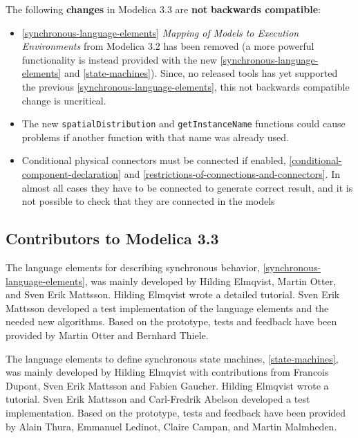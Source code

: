 The following \textbf{changes} in Modelica 3.3 are \textbf{not}
\textbf{backwards compatible}:

\begin{itemize}
\item
  \autoref{synchronous-language-elements} \emph{Mapping of Models to Execution Environments} from
  Modelica 3.2 has been removed (a more powerful functionality is
  instead provided with the new \autoref{synchronous-language-elements} and \autoref{state-machines}). Since, no
  released tools has yet supported the previous \autoref{synchronous-language-elements}, this not
  backwards compatible change is uncritical.
\item
  The new \lstinline!spatialDistribution! and \lstinline!getInstanceName! functions could cause
  problems if another function with that name was already used.
\end{itemize}

\begin{itemize}
\item
  Conditional physical connectors must be connected if enabled,
  \autoref{conditional-component-declaration}
  and \autoref{restrictions-of-connections-and-connectors}. In almost all cases they have to be connected
  to generate correct result, and it is not possible to check that they
  are connected in the models
\end{itemize}

\subsection{Contributors to Modelica 3.3}

The language elements for describing synchronous behavior, \autoref{synchronous-language-elements},
was mainly developed by Hilding Elmqvist, Martin Otter, and Sven Erik
Mattsson. Hilding Elmqvist wrote a detailed tutorial. Sven Erik Mattsson
developed a test implementation of the language elements and the needed
new algorithms. Based on the prototype, tests and feedback have been
provided by Martin Otter and Bernhard Thiele.

The language elements to define synchronous state machines, \autoref{state-machines},
was mainly developed by Hilding Elmqvist with contributions from
Francois Dupont, Sven Erik Mattsson and Fabien Gaucher. Hilding Elmqvist
wrote a tutorial. Sven Erik Mattsson and Carl-Fredrik Abelson developed
a test implementation. Based on the prototype, tests and feedback have
been provided by Alain Thura, Emmanuel Ledinot, Claire Campan, and
Martin Malmheden.

